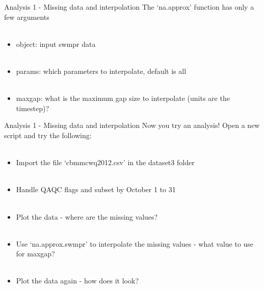 \documentclass[xcolor=svgnames]{beamer}\usepackage[]{graphicx}\usepackage[]{color}
\begin{document}
\begin{frame}[containsverbatim]{Analysis 1 - Missing data and interpolation}
The `na.approx' function has only a few arguments\\~\\
\begin{itemize}
\item object: input swmpr data \\~\\
\item params: which parameters to interpolate, default is all \\~\\
\item maxgap: what is the maximum gap size to interpolate (units are the timestep)?
\end{itemize}
\end{frame}

\begin{frame}[containsverbatim]{Analysis 1 - Missing data and interpolation}
Now you try an analysis! Open a new script and try the following: \\~\\
\begin{itemize}
\item Import the file `cbmmcwq2012.csv' in the dataset3 folder \\~\\
\item Handle QAQC flags and subset by October 1 to 31 \\~\\
\item Plot the data - where are the missing values?\\~\\
\item Use `na.approx.swmpr' to interpolate the missing values - what value to use for maxgap?\\~\\
\item Plot the data again - how does it look?
\end{itemize}
\end{frame}
\end{document}
